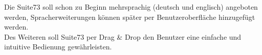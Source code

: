 Die Suite73 soll schon zu Beginn mehrsprachig (deutsch und englisch) angeboten werden, Spracherweiterungen können später per Benutzeroberfläche hinzugefügt werden.\\
Des Weiteren soll Suite73 per Drag \& Drop den Benutzer eine einfache und intuitive Bedienung gewährleisten.